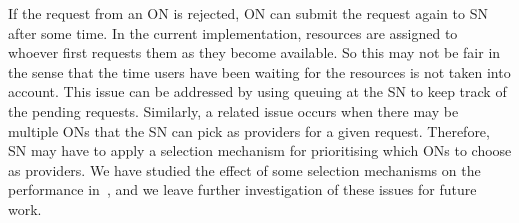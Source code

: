 If the request from an ON is rejected, ON can submit the request again to SN after some time.
In the current implementation, resources are assigned to whoever first requests them as they become available. 
So this may not be fair in the sense that the time users have been waiting for the resources is not taken into account.
This issue can be addressed by using queuing at the SN to keep track of the pending requests.
Similarly, a related issue occurs when there may be multiple ONs that the SN can pick as providers for a given request.
Therefore, SN may have to apply a selection mechanism for prioritising which ONs to choose as providers. 
We have studied the effect of some selection mechanisms 
on the performance in~\cite{Khan2013TowardsIncentives}, 
and we leave further investigation of these issues for future work.
